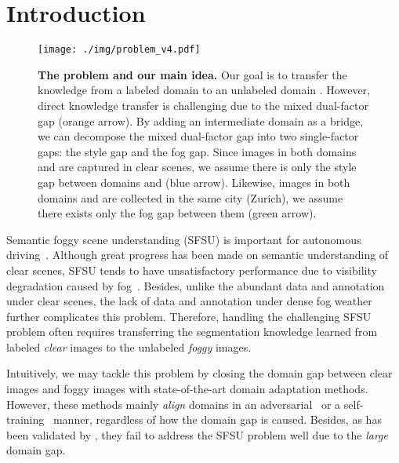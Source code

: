 \documentclass[10pt,twocolumn,letterpaper]{article}
\begin{document}
\section{Introduction}

\begin{figure}[t]
\centering
\texttt{[image: ./img/problem\_v4.pdf]}\\
\vspace{-2mm}
\caption{\textbf{The problem and our main idea.} Our goal is to transfer the knowledge from a labeled domain  to an unlabeled domain . However, direct knowledge transfer is challenging due to the mixed dual-factor gap (orange arrow). By adding an intermediate domain  as a bridge, we can decompose the mixed dual-factor gap into two single-factor gaps: the style gap and the fog gap. Since images in both domains  and  are captured in clear scenes, we assume there is only the style gap between domains  and  (blue arrow). Likewise, images in both domains  and  are collected in the same city (Zurich), we assume there exists only the fog gap between them (green arrow). 
}
\vspace{-4mm}
\label{fig:problem}
\end{figure}

Semantic foggy scene understanding (SFSU) is important for autonomous driving~\cite{sakaridis2018model,sakaridis2018semantic,dai2020curriculum,2019Purely}.
Although great progress has been made on semantic understanding of clear scenes, SFSU tends to have unsatisfactory performance due to visibility degradation caused by fog~\cite{narasimhan2003contrast,tan2008visibility}.
Besides, unlike the abundant data and annotation under clear scenes, the lack of data and annotation under dense fog weather further complicates this problem.
Therefore, handling the challenging SFSU problem often requires transferring the segmentation knowledge learned from labeled \emph{clear} images to the unlabeled \emph{foggy} images. 

Intuitively, we may tackle this problem by closing the domain gap between clear images and foggy images with state-of-the-art domain adaptation methods.
However, these methods mainly \emph{align} domains in an adversarial~\cite{tsai2018learning,Zhang_2018_CVPR,Chen_2018_CVPR,vu2019advent,chang2019all,Kim_2020_CVPR,li2020content,truong2021bimal,wang2020classes,yang2020fda} or a self-training~\cite{Choi_2019_ICCV,mei2020instance,tranheden2021dacs,araslanov2021self,guo2021metacorrection,gao2021dsp,zhang2021prototypical} manner, 
regardless of how the domain gap is caused. Besides, as has been validated by \cite{sakaridis2018model}, they fail to address the SFSU problem well due to the \emph{large} domain gap.
\end{document}
